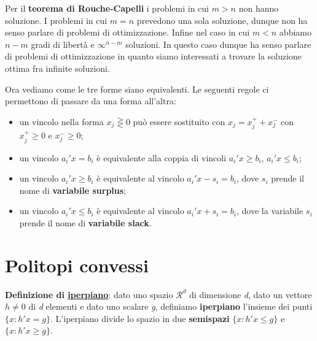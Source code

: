 \documentclass[11pt, oneside]{book}
\begin{document}
\par\bigskip

Per il {\bf teorema di Rouche-Capelli} i problemi in cui $m > n$ non
hanno soluzione. I problemi in cui $m=n$ prevedono una sola soluzione,
dunque non ha senso parlare di problemi di ottimizzazione. Infine nel
caso in cui $m < n$ abbiamo $n-m$ gradi di libert\`a e $\infty^{n-m}$
soluzioni. In questo caso dunque ha senso parlare di problemi di
ottimizzazione in quanto siamo interessati a trovare la soluzione
ottima fra infinite soluzioni. 

\par\bigskip

Ora vediamo come le tre forme siano equivalenti. Le seguenti regole ci
permettono di passare da una forma all'altra:

\begin{itemize}

\item un vincolo nella forma $x_j \gtreqless 0$ pu\`o essere sostituito
con $x_j = x_j^+ + x_j^-$ con $x_j^+ \geq 0$ e $x_j^- \geq 0$;

\item un vincolo $a_i'x = b_i$ \`e equivalente alla coppia di vincoli
  $a_i'x \geq b_i$, $a_i'x \leq b_i$;

\item un vincolo $a_i'x \geq b_i$ \`e equivalente al vincolo $a_i'x -
  s_i = b_i$, dove $s_i$ prende il nome di {\bf variabile surplus};
  
\item un vincolo $a_i'x \leq b_i$ \`e equivalente al vincolo $a_i'x +
  s_i = b_i$, dove la variabile $s_i$ prende il nome di {\bf variabile
  slack}.

\end{itemize}

\section{Politopi convessi}

{\bf Definizione di \underline{iperpiano}}: dato uno spazio
$\mathcal{R}^d$ di dimensione {\em d}, dato un vettore $h \neq 0$
di {\em d} elementi e dato uno scalare {\em g}, definiamo {\bf
  iperpiano} l'insieme dei punti $\{ x : h'x = g \}$. L'iperpiano
divide lo spazio in due {\bf semispazi} $\{x : h'x \leq g\}$ e $\{x :
h'x \geq g\}$.


\par\bigskip
\end{document}
